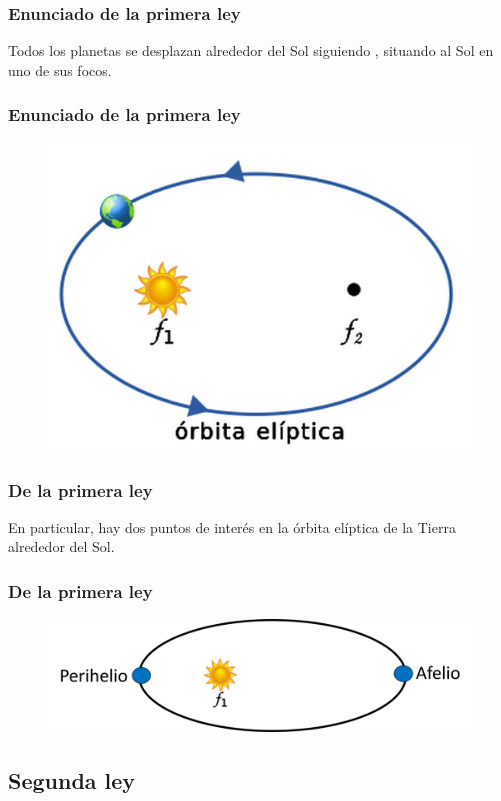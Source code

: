 \documentclass[14pt]{beamer}
\begin{document}
\begin{frame}
\frametitle{Enunciado de la primera ley}
Todos los planetas se desplazan alrededor del Sol siguiendo , situando al Sol en uno de sus focos.
\end{frame}
\begin{frame}
\frametitle{Enunciado de la primera ley}
\begin{figure}
    \centering
    \includegraphics[scale=0.4]{Imagenes/Kepler_Leyes_01.png}
\end{figure}
\end{frame}
\begin{frame}
\frametitle{De la primera ley}
En particular, hay dos puntos de interés en la órbita elíptica de la Tierra alrededor del Sol.
\end{frame}
\begin{frame}
\frametitle{De la primera ley}
\begin{figure}
    \centering
    \includegraphics[scale=0.75]{Imagenes/Kepler_Leyes_01_b.png}
\end{figure}
\end{frame}

\subsection{Segunda ley}
\end{document}
